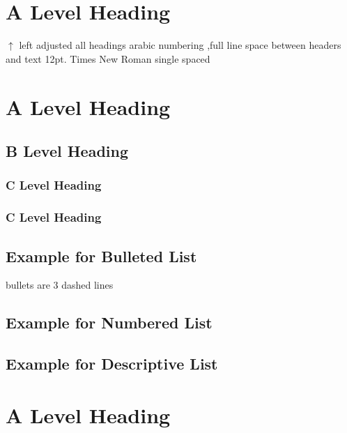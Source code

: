 \documentclass[12pt]{report}
\begin{document}
\normalsize
\flushleft
\singlespacing
\newpage
{}

\section{A Level Heading}
\color{red} $\uparrow$ left adjusted all headings arabic numbering ,full line space between headers and text \color{black}
\blindtext \cite{DBLP:journals/corr/JohnsonAL16} \color{red} 12pt. Times New Roman single spaced \color{black}
\section{A Level Heading}
\blindtext \cite{DBLP:journals/corr/RonnebergerFB15}
\subsection{B Level Heading}
\blindtext \cite{DBLP:journals/corr/abs-1803-09820}
\subsubsection{C Level Heading}
\blindtext
\subsubsection{C Level Heading}
\blindtext

\subsection{Example for Bulleted List}
\color{red} bullets are 3 dashed lines \color{black}
\blinditemize
\subsection{Example for Numbered List}
\blindenumerate
\subsection{Example for Descriptive List}
\blinddescription

\section{A Level Heading}
\blindtext
\end{document}
